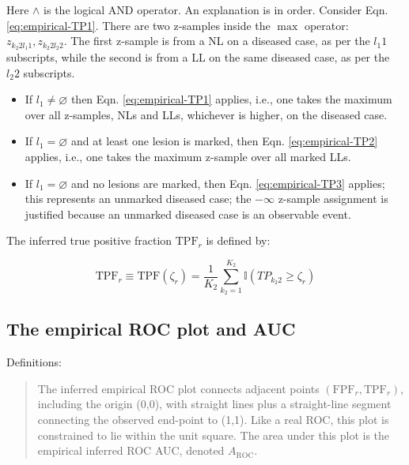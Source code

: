 \documentclass[
]{book}
\begin{document}
Here \(\land\) is the logical AND operator. An explanation is in order. Consider Eqn. \eqref{eq:empirical-TP1}. There are two z-samples inside the \(\max\) operator: \(z_{k_2 2 l_1 1} ,z_{k_2 2 l_2 2}\). The first z-sample is from a NL on a diseased case, as per the \(l_1 1\) subscripts, while the second is from a LL on the same diseased case, as per the \(l_2 2\) subscripts.

\begin{itemize}
\item
  If \(l_1 \neq \varnothing\) then Eqn. \eqref{eq:empirical-TP1} applies, i.e., one takes the maximum over all z-samples, NLs and LLs, whichever is higher, on the diseased case.
\item
  If \(l_1 = \varnothing\) and at least one lesion is marked, then Eqn. \eqref{eq:empirical-TP2} applies, i.e., one takes the maximum z-sample over all marked LLs.
\item
  If \(l_1 = \varnothing\) and no lesions are marked, then Eqn. \eqref{eq:empirical-TP3} applies; this represents an unmarked diseased case; the \(-\infty\) z-sample assignment is justified because an unmarked diseased case is an observable event.
\end{itemize}

The inferred true positive fraction \(\text{TPF}_r\) is defined by:

\begin{equation}
\text{TPF}_r \equiv \text{TPF}(\zeta_r) = \frac{1}{K_2}\sum_{k_2=1}^{K_2} \mathbb{I}\left ( TP_{k_2 2} \geq \zeta_r \right )
\label{eq:empirical-TPF}
\end{equation}

\hypertarget{empirical-definition-empirical-auc-roc}{%
\subsection{The empirical ROC plot and AUC}\label{empirical-definition-empirical-auc-roc}}

Definitions:

\begin{quote}
The inferred empirical ROC plot connects adjacent points \(\left( \text{FPF}_r, \text{TPF}_r \right )\), including the origin (0,0), with straight lines plus a straight-line segment connecting the observed end-point to (1,1). Like a real ROC, this plot is constrained to lie within the unit square. The area under this plot is the empirical inferred ROC AUC, denoted \(A_{\text{ROC}}\).
\end{quote}
\end{document}
